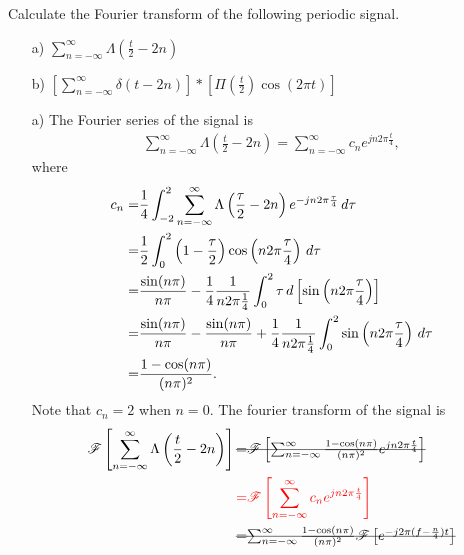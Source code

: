 \documentclass{assignment}
\begin{document}
\begin{prob}[20 pts]
    Calculate the Fourier transform of the following periodic signal.
    \begin{itemize}
        \item[a)] $\sum_{n=-\infty}^{\infty}\Lambda(\frac{t}{2}-2n)$
        \item[b)] $\left[\sum_{n=-\infty}^{\infty}\delta(t-2n)\right]*\left[\Pi(\frac{t}{2})\cos(2\pi t)\right]$
    \end{itemize}
\end{prob}
\begin{sol}
    \begin{itemize}
        \item[a)] The Fourier series of the signal is
        \begin{align}
            \sum_{n=-\infty}^{\infty}\Lambda\left(\frac{t}{2}-2n\right)=\sum_{n=-\infty}^{\infty}c_ne^{jn2\pi\frac{t}{4}},
        \end{align}
        where
        \begin{align}
            \notag c_n=&\frac{1}{4}\int_{-2}^2\sum_{n=-\infty}^{\infty}\Lambda\left(\frac{\tau}{2}-2n\right)e^{-jn2\pi\frac{\tau}{4}}\,d\tau\\
            \notag=&\frac{1}{2}\int_0^2\left(1-\frac{\tau}{2}\right)\cos\left(n2\pi \frac{\tau}{4}\right)\,d\tau\\
            \notag=&\frac{\sin(n\pi)}{n\pi}-\frac{1}{4}\frac{1}{n2\pi\frac{1}{4}}\int_0^2\tau\,d\left[\sin\left(n2\pi\frac{\tau}{4}\right)\right]\\
            \notag=&\frac{\sin(n\pi)}{n\pi}-\frac{\sin(n\pi)}{n\pi}+\frac{1}{4}\frac{1}{n2\pi\frac{1}{4}}\int_0^2\sin\left(n2\pi\frac{\tau}{4}\right)\,d\tau\\
            =&\frac{1-\cos(n\pi)}{(n\pi)^2}.
        \end{align}
        Note that $c_n=2$ when $n=0$.
        The fourier transform of the signal is
        \begin{align}
            \notag\mathscr{F}\left[\sum_{n=-\infty}^{\infty}\Lambda\left(\frac{t}{2}-2n\right)\right]\text{\sout{$=$}}&\text{\sout{$\mathscr{F}\left[\sum_{n=-\infty}^{\infty}\frac{1-\cos(n\pi)}{(n\pi)^2}e^{jn2\pi\frac{t}{4}}\right]$}}\\
            \notag{\color{red}=}&{\color{red}\mathscr{F}\left[\sum_{n=-\infty}^{\infty}c_ne^{jn2\pi\frac{t}{4}}\right]}\\
            \notag\text{\sout{$=$}}&\text{\sout{$\sum_{n=-\infty}^{\infty}\frac{1-\cos(n\pi)}{(n\pi)^2}\mathscr{F}\left[e^{-j2\pi(f-\frac{n}{4})t}\right]$}}\\

\end{align}
\end{itemize}
\end{sol}
\end{document}
